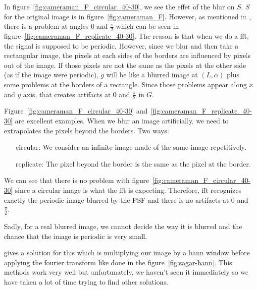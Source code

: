 In figure~\ref{fig:cameraman_F_circular_40-30},
we see the effet of the blur on $S$.
$S$ for the original image is in
figure~\ref{fig:cameraman_F}.
However, as mentioned in \cite{krahmer2006blind},
there is a problem at angles 0 and $\frac{\pi}{2}$ which
can be seen in figure~\ref{fig:cameraman_F_replicate_40-30}.
The reason is that when we do a fft,
the signal is supposed to be periodic.
However, since we blur and then take a rectangular image,
the pixels at each sides of the borders are influenced
by pixels out of the image.
If those pixels are not the same as the pixels at the other side
(as if the image were periodic),
$g$ will be like a blurred image at $(L,\alpha)$ plus
some problems at the borders of a rectangle.
Since those problems appear along $x$ and $y$ axis,
that creates artifacts at $0$ and $\frac{\pi}{2}$ in $G$.

Figure~\ref{fig:cameraman_F_circular_40-30}
and~\ref{fig:cameraman_F_replicate_40-30} are excellent
examples.
When we blur an image artificially, we need to extrapolates
the pixels beyond the borders. Two ways:
\begin{enumerate}
  \item[circular:] We consider an infinite image made of
    the same image repetitively.
  \item[replicate:] The pixel beyond the border is the
    same as the pixel at the border.
\end{enumerate}
We can see that there is no problem with
 figure~\ref{fig:cameraman_F_circular_40-30}
since a circular image is what the fft is expecting.
Therefore, fft recognizes exactly the periodic image
blurred by the PSF and there is no artifacts
at 0 and $\frac{\pi}{2}$.

Sadly, for a real blurred image, we cannot decide the
way it is blurred and the chance that the image is
periodic is very small.

\cite{krahmer2006blind} gives a solution for this
which is multiplying our image by a hann window before
applying the fourier transform like done
in the figure~\ref{fig:sagar-hann}.
This methods work very well but unfortunately,
we haven't seen it immediately so we have taken a lot
of time trying to find other solutions.

